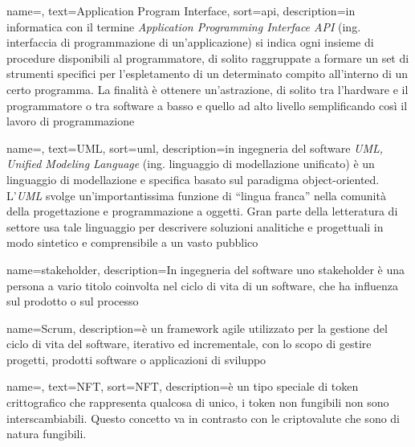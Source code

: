 
\renewcommand{\acronymname}{Acronimi e abbreviazioni}


    

\renewcommand{\glossaryname}{Glossario}

{
    name=,
    text=Application Program Interface,
    sort=api,
    description={in informatica con il termine \emph{Application Programming Interface API} (ing. interfaccia di programmazione di un'applicazione) si indica ogni insieme di procedure disponibili al programmatore, di solito raggruppate a formare un set di strumenti specifici per l'espletamento di un determinato compito all'interno di un certo programma. La finalità è ottenere un'astrazione, di solito tra l'hardware e il programmatore o tra software a basso e quello ad alto livello semplificando così il lavoro di programmazione}
}

{
    name=,
    text=UML,
    sort=uml,
    description={in ingegneria del software \emph{UML, Unified Modeling Language} (ing. linguaggio di modellazione unificato) è un linguaggio di modellazione e specifica basato sul paradigma object-oriented. L'\emph{UML} svolge un'importantissima funzione di ``lingua franca'' nella comunità della progettazione e programmazione a oggetti. Gran parte della letteratura di settore usa tale linguaggio per descrivere soluzioni analitiche e progettuali in modo sintetico e comprensibile a un vasto pubblico}
}

{
	name={stakeholder},
	description={In ingegneria del software uno stakeholder è una persona a vario titolo coinvolta nel ciclo di vita di un software, che ha influenza sul prodotto o sul processo}
}

{
	name={Scrum},
	description={è un framework agile utilizzato per la gestione del ciclo di vita del software, iterativo ed incrementale, con lo scopo di gestire progetti, prodotti software o applicazioni di sviluppo}
}

{
	name=,
	text=NFT,
	sort=NFT,
	description={è un tipo speciale di token crittografico che rappresenta qualcosa di unico, i token non fungibili non sono interscambiabili. Questo concetto va in contrasto con le criptovalute che sono di natura fungibili.}
}

